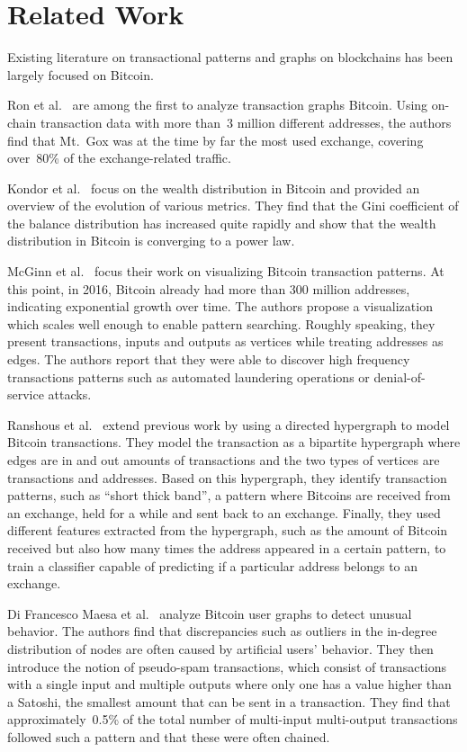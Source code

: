 \section{Related Work}
\label{sec:related}

Existing literature on transactional patterns and graphs on blockchains has been largely focused on Bitcoin.

Ron et al.~\cite{10.1007/978-3-642-39884-1_2} are among the first to analyze transaction graphs Bitcoin. Using on-chain transaction data with more than~3 million different addresses, the authors find that Mt.~Gox was at the time by far the most used exchange, covering over~80\% of the exchange-related traffic. 

Kondor et al.~\cite{10.1371/journal.pone.0086197} focus on the wealth distribution in Bitcoin and provided an overview of the evolution of various metrics. They find that the Gini coefficient of the balance distribution has increased quite rapidly and show that the wealth distribution in Bitcoin is converging to a power law.

McGinn et al.~\cite{mcginn2016visualizing} focus their work on visualizing Bitcoin transaction patterns. At this point, in 2016, Bitcoin already had more than 300 million addresses, indicating exponential growth over time. The authors propose a visualization which scales well enough to enable pattern searching. Roughly speaking, they present transactions, inputs and outputs as vertices while treating addresses as edges. The authors report that they were able to discover high frequency transactions patterns such as automated laundering operations or denial-of-service attacks.

Ranshous et al.~\cite{10.1007/978-3-319-70278-0_16} extend previous work by using a directed hypergraph to model Bitcoin transactions. They model the transaction as a bipartite hypergraph where edges are in and out amounts of transactions and the two types of vertices are transactions and addresses. Based on this hypergraph, they identify transaction patterns, such as ``short thick band'', a pattern where Bitcoins are received from an exchange, held for a while and sent back to an exchange. Finally, they used different features extracted from the hypergraph, such as the amount of Bitcoin received but also how many times the address appeared in a certain pattern, to train a classifier capable of predicting if a particular address belongs to an exchange.

Di Francesco Maesa et al.~\cite{10.1007/978-3-319-50901-3_59} analyze Bitcoin user graphs to detect unusual behavior. The authors find that discrepancies such as outliers in the in-degree distribution of nodes are often caused by artificial users' behavior. They then introduce the notion of pseudo-spam transactions, which consist of transactions with a single input and multiple outputs where only one has a value higher than a Satoshi, the smallest amount that can be sent in a transaction. They find that approximately~0.5\% of the total number of multi-input multi-output transactions followed such a pattern and that these were often chained.

